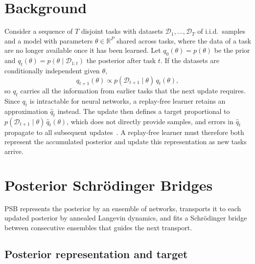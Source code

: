 
\section{Background}
\label{sec:background}

Consider a sequence of $T$ disjoint tasks with datasets
$\mathcal{D}_1,\ldots,\mathcal{D}_T$ of i.i.d.\ samples and a model with
parameters $\theta\in\mathbb{R}^P$ shared across tasks, where the data of a task
are no longer available once it has been learned. Let $q_0(\theta)=p(\theta)$ be
the prior and $q_t(\theta)=p(\theta\mid\mathcal{D}_{1:t})$ the posterior after
task $t$. If the datasets are conditionally independent given $\theta$,
\begin{equation}
    q_{t+1}(\theta)\propto p(\mathcal{D}_{t+1}\mid\theta)\,q_t(\theta),
    \label{eq:sequential_bayes}
\end{equation}
so $q_t$ carries all the information from earlier tasks that the next update
requires. Since $q_t$ is intractable for neural networks, a replay-free learner
retains an approximation $\hat q_t$ instead. The update then defines a target
proportional to $p(\mathcal{D}_{t+1}\mid\theta)\,\hat q_t(\theta)$, which does not
directly provide samples, and errors in $\hat q_t$ propagate to all subsequent
updates~\cite{kessler2023sequential}. A replay-free learner must therefore both
represent the accumulated posterior and update this representation as new tasks
arrive.

\section{Posterior Schr\"odinger Bridges}
\label{sec:method}

PSB represents the posterior by an ensemble of networks, transports it to each
updated posterior by annealed Langevin dynamics, and fits a Schr\"odinger bridge
between consecutive ensembles that guides the next transport.

\subsection{Posterior representation and target}
\label{sec:representation}


